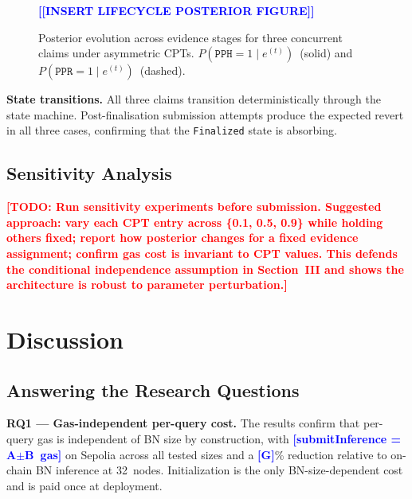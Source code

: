 \documentclass[journal]{IEEEtran}
\newcommand{\todo}[1]{\textcolor{red}{\textbf{[TODO: #1]}}}
\newcommand{\placeholder}[1]{\textcolor{blue}{\textbf{[#1]}}}
\begin{document}
\begin{figure}[t]
  \centering
  \placeholder{[INSERT LIFECYCLE POSTERIOR FIGURE]}
  \caption{Posterior evolution across evidence stages
  for three concurrent claims under asymmetric CPTs.
  $P(\texttt{PPH}=1\mid e^{(t)})$~(solid) and
  $P(\texttt{PPR}=1\mid e^{(t)})$~(dashed).}
  \label{fig:lifecycle}
\end{figure}

\textbf{State transitions.}
All three claims transition deterministically through
the state machine. Post-finalisation submission
attempts produce the expected revert in all three
cases, confirming that the \texttt{Finalized} state
is absorbing.

\subsection{Sensitivity Analysis}
\label{sec:exp-sensitivity}

\todo{Run sensitivity experiments before submission.
Suggested approach: vary each CPT entry across
\{0.1, 0.5, 0.9\} while holding others fixed; report
how posterior changes for a fixed evidence assignment;
confirm gas cost is invariant to CPT values. This
defends the conditional independence assumption in
Section~III and shows the architecture is robust to
parameter perturbation.}


\section{Discussion}
\label{sec:results-discussion}

\subsection{Answering the Research Questions}

\textbf{RQ1 --- Gas-independent per-query cost.}
The results confirm that per-query gas is independent
of BN size by construction, with
\placeholder{submitInference = A$\pm$B~gas} on Sepolia
across all tested sizes and a \placeholder{G}\%
reduction relative to on-chain BN inference at
32~nodes. Initialization is the only BN-size-dependent
cost and is paid once at deployment.
\end{document}
